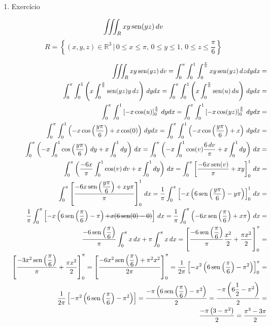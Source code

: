 \begin{enumerate}
	\item Exercício
	
	\begin{equation*}
		\iiint_R xy\operatorname{sen}(yz)\, dv
	\end{equation*}
		\begin{equation*}
		R = \left\{(x, y, z) \in \mathbb{R}^3 \,|\, 0 \leq x \leq \pi,\, 0 \leq y \leq 1,\, 0 \leq z \leq \dfrac{\pi}{6}\right\}
	\end{equation*}
	
	\begin{align*}
		\iiint_R xy\sen(yz)\, dv = \int_0^{\pi} \int_0^1 \int_0^{\frac{\pi}{6}} xy\sen(yz)\, dzdydx =\\  \int_0^{\pi} \int_0^1\left(x\int_0^{\frac{\pi}{6}} \sen(yz)y\, dz\right)\, dydx = \int_0^{\pi} \int_0^1\left(x\int_0^{\frac{\pi}{6}} \sen(u)\, du\right)\, dydx =\\ \int_0^{\pi} \int_0^1 \left[-x\cos(u)\right]_0^{\frac{\pi}{6}}\, dydx = \int_0^{\pi} \int_0^1 \left[-x\cos(yz)\right]_0^{\frac{\pi}{6}}\, dydx =\\ \int_0^{\pi} \int_0^1 \left(-x\cos\left(\dfrac{y\pi}{6}\right) + x\cos(0)\right)\, dydx = \int_0^{\pi} \int_0^1 \left(-x\cos\left(\dfrac{y\pi}{6}\right) + x\right)\, dydx =\\ \int_0^{\pi}\left(-x\int_0^1\cos\left(\dfrac{y\pi}{6}\right)\, dy + x\int_0^1 dy \right)\, dx = \int_0^{\pi}\left(-x\int_0^1\cos(v)\dfrac{6\, dv}{\pi} + x\int_0^1 dy \right)\, dx =\\ \int_0^{\pi}\left(\dfrac{-6x}{\pi}\int_0^1\cos(v)\, dv + x\int_0^1 dy \right)\, dx = \int_0^{\pi}\left[\dfrac{-6x\sen(v)}{\pi} + xy\right]_0^1\, dx =\\ \int_0^{\pi}\left[\dfrac{-6x\sen\left(\dfrac{y\pi}{6}\right) + xy\pi}{\pi}\right]_0^1\, dx = \dfrac{1}{\pi}\int_0^{\pi}\left[-x\left(6\sen\left(\dfrac{y\pi}{6}\right) - y\pi\right)\right]_0^1\, dx =\\ \dfrac{1}{\pi}\int_0^{\pi}\left[-x\left(6\sen\left(\dfrac{\pi}{6}\right) - \pi\right) \overstrike{+ x(6\sen(0) - 0)}\right]\, dx = \dfrac{1}{\pi}\int_0^{\pi}\left(-6x\sen\left(\dfrac{\pi}{6}\right) + x\pi\right)\, dx =\\ \dfrac{-6\sen\left(\dfrac{\pi}{6}\right)}{\pi}\int_0^{\pi} x\, dx + \pi\int_0^{\pi} x\, dx = \left[\dfrac{-6\sen\left(\dfrac{\pi}{6}\right)}{\pi}\dfrac{x^2}{2} + \dfrac{\pi x^2}{2}\right]_0^{\pi} =\\ \left[\dfrac{-3x^2\sen\left(\dfrac{\pi}{6}\right)}{\pi} + \dfrac{\pi x^2}{2}\right]_0^{\pi} = \left[\dfrac{-6x^2\sen\left(\dfrac{\pi}{6}\right) + \pi^2 x^2}{2\pi}\right]_0^{\pi} = \dfrac{1}{2\pi}\left[-x^2\left(6\sen\left(\dfrac{\pi}{6}\right) - \pi^2\right)\right]_0^{\pi} =\\ \dfrac{1}{2\pi}\left[-\pi^2\left(6\sen\left(\dfrac{\pi}{6}\right) - \pi^2\right)\right] = \dfrac{-\pi\left(6\sen\left(\dfrac{\pi}{6}\right) - \pi^2\right)}{2} = \dfrac{-\pi\left(6\dfrac{1}{2} - \pi^2\right)}{2} =\\ \dfrac{-\pi\left(3 - \pi^2\right)}{2} = \dfrac{\pi^3 - 3\pi}{2}

\end{align*}
\end{enumerate}
